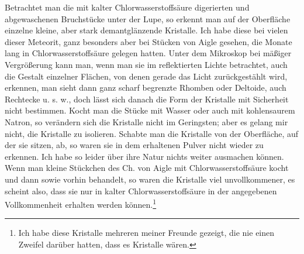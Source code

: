 \documentclass[a4paper, 11pt, oneside]{article}
\begin{document}
Betrachtet man die mit kalter Chlorwasserstoffsäure digerierten und abgewaschenen Bruchstücke unter der Lupe, so erkennt man auf der Oberfläche einzelne kleine, aber stark demantglänzende Kristalle. Ich habe diese bei vielen dieser Meteorit, ganz besonders aber bei Stücken von Aigle gesehen, die Monate lang in Chlorwasserstoffsäure gelegen hatten. Unter dem Mikroskop bei mäßiger Vergrößerung kann man, wenn man sie im reflektierten Lichte betrachtet, auch die Gestalt einzelner Flächen, von denen gerade das Licht zurückgestählt wird, erkennen, man sieht dann ganz scharf begrenzte Rhomben oder Deltoide, auch Rechtecke u. s. w., doch lässt sich danach die Form der Kristalle mit Sicherheit nicht bestimmen. Kocht man die Stücke mit Wasser oder auch mit kohlensaurem Natron, so verändern sich die Kristalle nicht im Geringsten; aber es gelang mir nicht, die Kristalle zu isolieren. Schabte man die Kristalle von der Oberfläche, auf der sie sitzen, ab, so waren sie in dem erhaltenen Pulver nicht wieder zu erkennen. Ich habe so leider über ihre Natur nichts weiter ausmachen können. Wenn man kleine Stückchen des Ch. von Aigle mit Chlorwasserstoffsäure kocht und dann sowie vorhin behandelt, so waren die Kristalle viel unvollkommener, es scheint also, dass sie nur in kalter Chlorwasserstoffsäure in der angegebenen Vollkommenheit erhalten werden können.\footnote{Ich habe diese Kristalle mehreren meiner Freunde gezeigt, die nie einen Zweifel darüber hatten, dass es Kristalle wären.}
\end{document}
